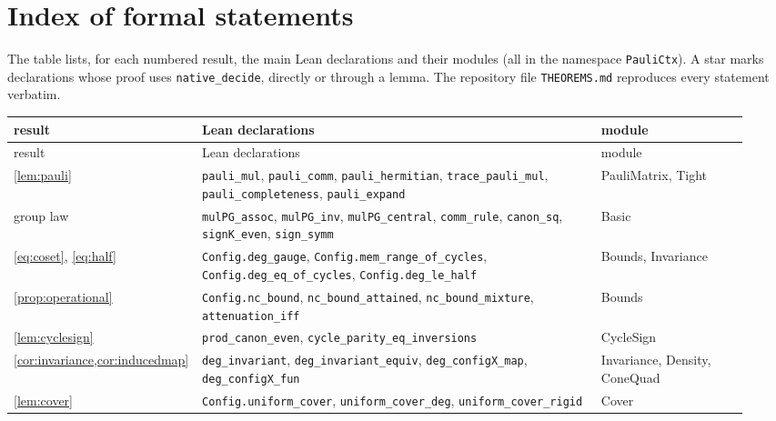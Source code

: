 \documentclass[a4paper,onecolumn,11pt,unpublished,nopdfoutputerror]{quantumarticle}
\theoremstyle{definition}
\newcommand{\lname}[1]{\texttt{\textcolor{leangreen}{#1}}}
\begin{document}
\section{Index of formal statements}\label{app:leanindex}

The table lists, for each numbered result, the main Lean declarations and their modules (all in the namespace
\texttt{PauliCtx}). A star marks declarations whose proof uses \texttt{native\_decide}, directly or through a
lemma. The repository file \texttt{THEOREMS.md} reproduces every statement verbatim.

{\small
\renewcommand{\arraystretch}{1.08}
\begin{longtable}{@{}>{\raggedright\arraybackslash}p{0.2\linewidth}>{\raggedright\arraybackslash}p{0.54\linewidth}>{\raggedright\arraybackslash}p{0.2\linewidth}@{}}
\toprule
result & Lean declarations & module\\\midrule
\endfirsthead
\toprule
result & Lean declarations & module\\\midrule
\endhead
\bottomrule
\endfoot
\cref{lem:pauli} & \lname{pauli\_mul}, \lname{pauli\_comm}, \lname{pauli\_hermitian}, \lname{trace\_pauli\_mul}, \lname{pauli\_completeness}, \lname{pauli\_expand} & PauliMatrix, Tight\\
group law & \lname{mulPG\_assoc}, \lname{mulPG\_inv}, \lname{mulPG\_central}, \lname{comm\_rule}, \lname{canon\_sq}, \lname{signK\_even}, \lname{sign\_symm} & Basic\\
\eqref{eq:coset}, \eqref{eq:half} & \lname{Config.deg\_gauge}, \lname{Config.mem\_range\_of\_cycles}, \lname{Config.deg\_eq\_of\_cycles}, \lname{Config.deg\_le\_half} & Bounds, Invariance\\
\cref{prop:operational} & \lname{Config.nc\_bound}, \lname{nc\_bound\_attained}, \lname{nc\_bound\_mixture}, \lname{attenuation\_iff} & Bounds\\
\cref{lem:cyclesign} & \lname{prod\_canon\_even}, \lname{cycle\_parity\_eq\_inversions} & CycleSign\\
\cref{cor:invariance,cor:inducedmap} & \lname{deg\_invariant}, \lname{deg\_invariant\_equiv}, \lname{deg\_configX\_map}, \lname{deg\_configX\_fun} & Invariance, Density, ConeQuad\\
\cref{lem:cover} & \lname{Config.uniform\_cover}, \lname{uniform\_cover\_deg}, \lname{uniform\_cover\_rigid} & Cover\\

\end{longtable}}
\end{document}
